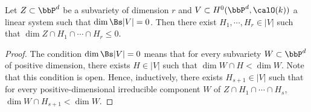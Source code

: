 \begin{lemma}[label=\labelNFM{lem:dimension-drop-of-intersection-of-general-hypersurface}, status=draft, tag=0000000]
	Let $Z \subset \bbP^d$ be a subvariety of dimension $r$ and $V \subset H^0(\bbP^d,\calO(k))$ a linear system such that $\dim \Bs |V| = 0$.
	Then there exist $H_1,\cdots,H_r \in |V|$ such that $\dim Z \cap H_1 \cap \cdots \cap H_r \leq 0$.
\end{lemma}
\begin{proof}
	The condition $\dim \Bs |V| = 0$ means that for every subvariety $W \subset \bbP^d$ of positive dimension, there exists $H \in |V|$ such that $\dim W \cap H < \dim W$.
	Note that this condition is open.
	Hence, inductively, there exists $H_{s+1} \in |V|$ such that for every positive-dimensional irreducible component $W$ of $Z \cap H_1 \cap \cdots \cap H_s$, $\dim W \cap H_{s+1} < \dim W$.
\end{proof}


